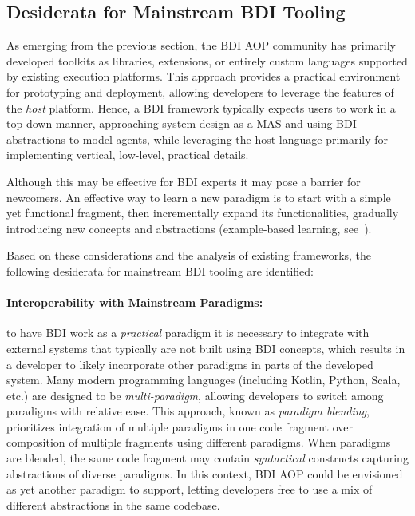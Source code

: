 \subsection{Desiderata for Mainstream \acs{BDI} Tooling}

As emerging from the previous section,
the \ac{BDI} \ac{AOP} community has primarily developed toolkits
as libraries, extensions, or entirely custom languages
supported by existing execution platforms.
%
This approach provides a practical environment for prototyping and deployment,
allowing developers to leverage the features of the \emph{host} platform.
%
Hence,
a \ac{BDI} framework typically expects users to work in a top-down manner,
approaching system design as a \ac{MAS} and using \ac{BDI} abstractions to model agents,
while leveraging the host language primarily for implementing vertical, low-level, practical details.

Although this may be effective for \ac{BDI} experts
it may pose a barrier for newcomers.
%
An effective way to learn a new paradigm is to start with a simple yet functional fragment,
then incrementally expand its functionalities,
gradually introducing new concepts and abstractions (example-based learning, see~\cite{vanGog2010}).


Based on these considerations and the analysis of existing frameworks, the following desiderata for mainstream \ac{BDI} tooling are identified:

\paragraph{Interoperability with Mainstream Paradigms:} to have \ac{BDI} work as a \emph{practical} paradigm it is necessary to integrate with external systems that typically are not built using \ac{BDI} concepts, which results in a developer to likely incorporate other paradigms in parts of the developed system.
%
Many modern programming languages (including Kotlin, Python, Scala, etc.) are designed to be \emph{multi-paradigm}, allowing developers to switch among paradigms with relative ease.
%
This approach, known as \emph{paradigm blending},
prioritizes integration of multiple paradigms in one code fragment
over composition of multiple fragments using different paradigms.
%
When paradigms are blended,
the same code fragment may contain \emph{syntactical}
constructs capturing abstractions of diverse paradigms.
%
In this context, \ac{BDI} \ac{AOP} could be envisioned
as yet another paradigm to support,
letting developers free to use a mix of different abstractions in the same codebase.


